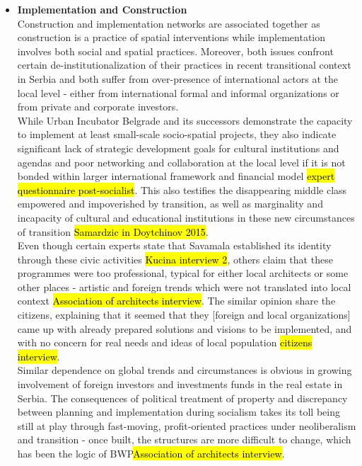 \documentclass[11pt]{report}
\begin{document}
\begin{itemize}
\item \textbf{Implementation and Construction}
\\
Construction and implementation networks are associated together as construction is a practice of spatial interventions while implementation involves both social and spatial practices. Moreover, both issues confront certain de-institutionalization of their practices in recent transitional context in Serbia and both suffer from over-presence of international actors at the local level - either from international formal and informal organizations or from private and corporate investors.
\\
While Urban Incubator Belgrade and its successors demonstrate the capacity to implement at least small-scale socio-spatial projects, they also indicate significant lack of strategic development goals for cultural institutions and agendas and poor networking and collaboration at the local level if it is not bonded within larger international framework and financial model \hl{expert questionnaire post-socialist}.
This also testifies the disappearing middle class empowered and impoverished by transition, as well as marginality and incapacity of cultural and educational institutions in these new circumstances of transition \hl{Samardzic in Doytchinov 2015}.
\\
Even though certain experts state that Savamala established its identity through these civic activities \hl{Kucina interview 2}, others claim that these programmes were too professional, typical for either local architects or some other places - artistic and foreign trends which were not translated into local context \hl{Association of architects interview}.
The similar opinion share the citizens, explaining that it seemed that they [foreign and local organizations] came up with already prepared solutions and visions to be implemented, and with no concern for real needs and ideas of local population \hl{citizens interview}.
\\
Similar dependence on global trends and circumstances is obvious in growing involvement of foreign investors and investments funds in the real estate in Serbia. The consequences of political treatment of property and discrepancy between planning and implementation during socialism takes its toll being still at play through fast-moving, profit-oriented practices under neoliberalism and transition - once built, the structures are more difficult to change, which has been the logic of BWP\footnotemark \hl{Association of architects interview}.


\end{itemize}
\end{document}
